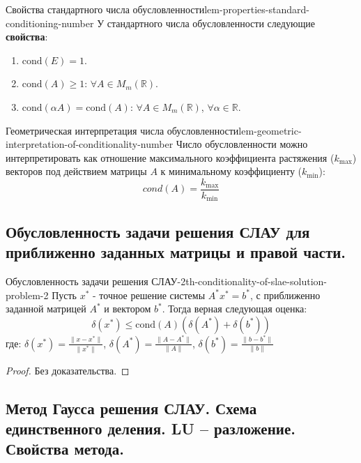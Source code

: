 \documentclass[14pt]{extarticle}
\begin{document}
    \begin{lemma}{Свойства стандартного числа обусловленности}{lem-properties-standard-conditioning-number}
        У стандартного числа обусловленности следующие \textbf{свойства}:
        \begin{enumerate}
            \item $\text{cond}(E) = 1$.
            \item $\text{cond}(A) \geq 1$: $\forall A \in M_{m}(\mathbb{R})$.
            \item $\text{cond}(\alpha A) = \text{cond}(A)$: $\forall A \in M_{m}(\mathbb{R})$, $\forall \alpha \in \mathbb{R}$.
        \end{enumerate}
    \end{lemma}

    \begin{lemma}{Геометрическая интерпретация числа обусловленности}{lem-geometric-interpretation-of-conditionality-number}
        Число обусловленности можно интерпретировать как отношение максимального коэффициента растяжения ($k_{\max}$) векторов под действием матрицы $A$ к минимальному коэффициенту ($k_{\min}$):
        $$cond(A) = \frac{k_{\max}}{k_{\min}}$$
    \end{lemma}

\clearpage
\subsection{Обусловленность задачи решения СЛАУ для приближенно заданных матрицы и правой части.}

    \begin{theorem}{Обусловленность задачи решения СЛАУ-2}{th-conditionality-of-slae-solution-problem-2}
        Пусть $x^{*}$ - точное решение системы $A^{*}x^{*} = b^{*}$, с приближенно заданной матрицей $A^{*}$ и вектором $b^{*}$. Тогда верная следующая оценка:
        $$\delta(x^{*}) \leq \text{cond}(A)(\delta(A^{*}) + \delta(b^{*}))$$
        где: $\delta(x^{*}) = \frac{\|x - x^{*}\|}{\|x^{*}\|}$, $\delta(A^{*}) = \frac{\|A - A^{*}\|}{\|A\|}$, $\delta(b^{*}) = \frac{\|b - b^{*}\|}{\|b\|}$
    
        \begin{proof}
            Без доказательства.
        \end{proof}
    \end{theorem}

\clearpage
\subsection{Метод Гаусса решения СЛАУ. Схема единственного деления. LU – разложение. Свойства метода.}
\end{document}
